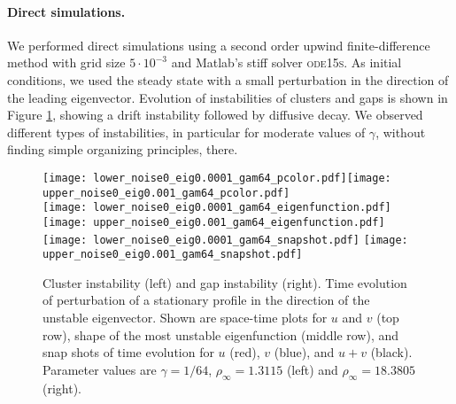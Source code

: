 \documentclass[10pt]{article}
\begin{document}

\paragraph{Direct simulations.} 
We performed direct simulations using a second order upwind finite-difference method with grid size $5\cdot10^{-3}$ and Matlab's stiff solver \textsc{ode15s}. As initial conditions, we used the steady state with a small perturbation in the direction of the leading eigenvector. Evolution of instabilities of clusters and gaps is shown in Figure \ref{f:gc}, showing a drift instability followed by diffusive decay. We observed different types of instabilities, in particular for moderate values of $\gamma$, without finding simple organizing principles, there. 

% 
% 
% 




\begin{figure}[H]
\texttt{[image: lower\_noise0\_eig0.0001\_gam64\_pcolor.pdf]}\hfill \texttt{[image: upper\_noise0\_eig0.001\_gam64\_pcolor.pdf]}\\
\texttt{[image: lower\_noise0\_eig0.0001\_gam64\_eigenfunction.pdf]}\hfill
\texttt{[image: upper\_noise0\_eig0.001\_gam64\_eigenfunction.pdf]}\\
\texttt{[image: lower\_noise0\_eig0.0001\_gam64\_snapshot.pdf]}\hfill
\texttt{[image: upper\_noise0\_eig0.001\_gam64\_snapshot.pdf]}
\caption{Cluster instability (left) and gap instability (right). Time evolution of perturbation of a stationary profile in the direction of the unstable eigenvector. Shown are space-time plots  for $u$ and $v$ (top row), shape of the most unstable eigenfunction (middle row), and snap shots of time evolution for $u$ (red), $v$ (blue), and $u+v$ (black). Parameter values are  $\gamma = 1/64$, $\rho_\infty=1.3115$ (left) and $\rho_\infty=18.3805$ (right).}\label{f:gc}
\end{figure}
\end{document}
